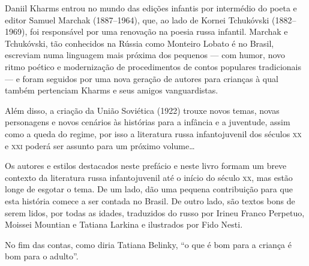 Daniil Kharms entrou no mundo das edições infantis por intermédio do
poeta e editor Samuel Marchak (1887--1964), que, ao lado de Kornei
Tchukóvski (1882--1969), foi responsável por uma renovação na poesia
russa infantil. Marchak e Tchukóvski, tão conhecidos na Rússia como
Monteiro Lobato é no Brasil, escreviam numa linguagem mais próxima dos
pequenos --- com humor, novo ritmo poético e modernização de
procedimentos de contos populares tradicionais --- e foram seguidos por
uma nova geração de autores para crianças à qual também pertenciam
Kharms e seus amigos vanguardistas.

Além disso, a criação da União Soviética (1922) trouxe novos temas,
novas personagens e novos cenários às histórias para a infância e a
juventude, assim como a queda do regime, por isso a literatura russa
infantojuvenil dos séculos \textsc{xx} e \textsc{xxi} poderá ser assunto para um próximo
volume\ldots{}

Os autores e estilos destacados neste prefácio e neste livro formam um
breve contexto da literatura russa infantojuvenil até o início do século
\textsc{xx}, mas estão longe de esgotar o tema. De um lado, dão uma pequena
contribuição para que esta história comece a ser contada no Brasil. De
outro lado, são textos bons de serem lidos, por todas as idades,
traduzidos do russo por Irineu Franco Perpetuo, Moissei Mountian e
Tatiana Larkina e ilustrados por Fido Nesti.

No fim das contas, como diria Tatiana Belinky, ``o que é bom para a
criança é bom para o adulto''.

